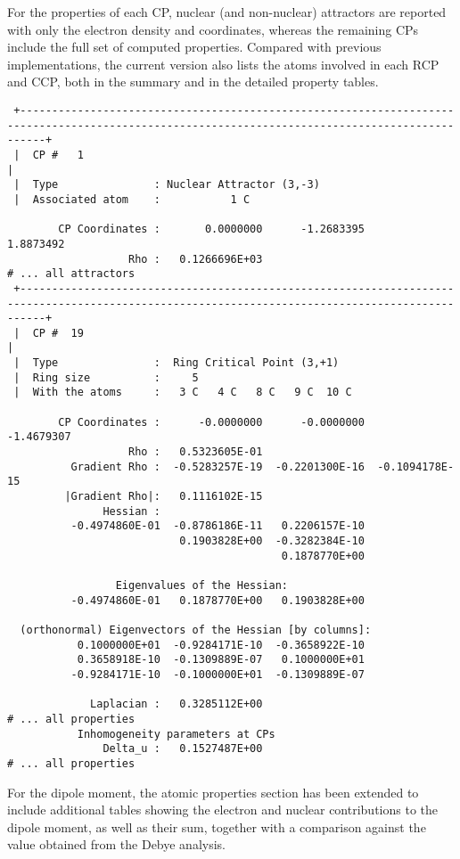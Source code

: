 \newpage

For the properties of each \gls{CP}, nuclear (and non-nuclear) attractors are
reported with only the electron density and coordinates, whereas the remaining
\glspl{CP} include the full set of computed properties. Compared with previous
implementations, the current version also lists the atoms involved in each
\gls{RCP} and \gls{CCP}, both in the summary and in the detailed property
tables.

\begin{lstlisting}
 +------------------------------------------------------------------------------------------------------------------------------------------------+
 |  CP #   1                                                              |
 |  Type               : Nuclear Attractor (3,-3)
 |  Associated atom    :           1 C
 
        CP Coordinates :       0.0000000      -1.2683395       1.8873492
                   Rho :   0.1266696E+03
# ... all attractors
 +------------------------------------------------------------------------------------------------------------------------------------------------+
 |  CP #  19                                                              |
 |  Type               :  Ring Critical Point (3,+1) 
 |  Ring size          :     5
 |  With the atoms     :   3 C   4 C   8 C   9 C  10 C

        CP Coordinates :      -0.0000000      -0.0000000      -1.4679307
                   Rho :   0.5323605E-01
          Gradient Rho :  -0.5283257E-19  -0.2201300E-16  -0.1094178E-15
         |Gradient Rho|:   0.1116102E-15
               Hessian :
          -0.4974860E-01  -0.8786186E-11   0.2206157E-10
                           0.1903828E+00  -0.3282384E-10
                                           0.1878770E+00
 
                 Eigenvalues of the Hessian:
          -0.4974860E-01   0.1878770E+00   0.1903828E+00
 
  (orthonormal) Eigenvectors of the Hessian [by columns]:
           0.1000000E+01  -0.9284171E-10  -0.3658922E-10
           0.3658918E-10  -0.1309889E-07   0.1000000E+01
          -0.9284171E-10  -0.1000000E+01  -0.1309889E-07
 
             Laplacian :   0.3285112E+00
# ... all properties 
           Inhomogeneity parameters at CPs
               Delta_u :   0.1527487E+00
# ... all properties 
\end{lstlisting}

\newpage
For the dipole moment, the atomic properties section has been extended to
include additional tables showing the electron and nuclear contributions to
the dipole moment, as well as their sum, together with a comparison against
the value obtained from the Debye analysis.

